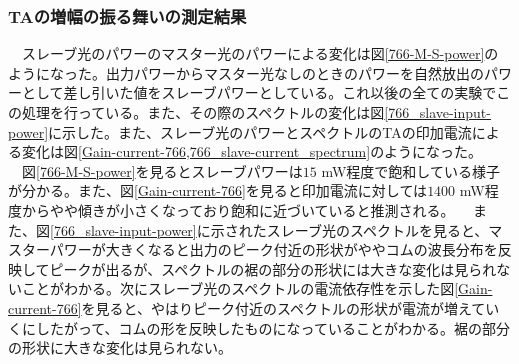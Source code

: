 \documentclass[uplatex, dvipdfmx, a4paper, report, papersize, 11pt]{jsbook}
\begin{document}
\subsubsection{TAの増幅の振る舞いの測定結果}
　スレーブ光のパワーのマスター光のパワーによる変化は図\ref{766-M-S-power}のようになった。出力パワーからマスター光なしのときのパワーを自然放出のパワーとして差し引いた値をスレーブパワーとしている。これ以後の全ての実験でこの処理を行っている。また、その際のスペクトルの変化は図\ref{766_slave-input-power}に示した。また、スレーブ光のパワーとスペクトルのTAの印加電流による変化は図\ref{Gain-current-766,766_slave-current_spectrum}のようになった。\\
　図\ref{766-M-S-power}を見るとスレーブパワーは$15$ mW程度で飽和している様子が分かる。また、図\ref{Gain-current-766}を見ると印加電流に対しては$1400$ mW程度からやや傾きが小さくなっており飽和に近づいていると推測される。
　また、図\ref{766_slave-input-power}に示されたスレーブ光のスペクトルを見ると、マスターパワーが大きくなると出力のピーク付近の形状がややコムの波長分布を反映してピークが出るが、スペクトルの裾の部分の形状には大きな変化は見られないことがわかる。次にスレーブ光のスペクトルの電流依存性を示した図\ref{Gain-current-766}を見ると、やはりピーク付近のスペクトルの形状が電流が増えていくにしたがって、コムの形を反映したものになっていることがわかる。裾の部分の形状に大きな変化は見られない。
\newpage
\end{document}
